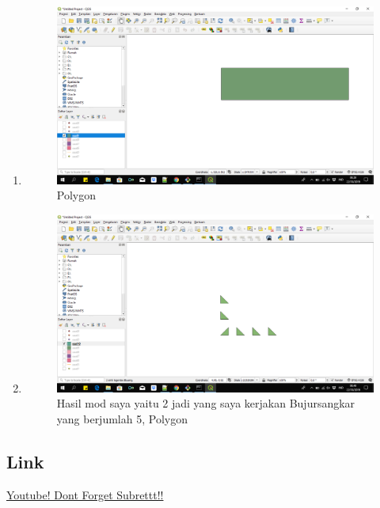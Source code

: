 \begin{enumerate}
	\item 
	
	\begin{figure}[H]
		\includegraphics[width=12cm]{figures/1174063/9.PNG}
		\centering
		\caption{Polygon}
	\end{figure}
	
	\item 
	
	\begin{figure}[H]
		\includegraphics[width=12cm]{figures/1174063/10.PNG}
		\centering
		\caption{Hasil mod saya yaitu 2 jadi yang saya kerjakan Bujursangkar yang berjumlah 5, Polygon}
	\end{figure}	
\end{enumerate}

\subsection{Link}
\href{https://youtu.be/Yb9XchNG3qY}{Youtube! Dont Forget Subrettt!!}